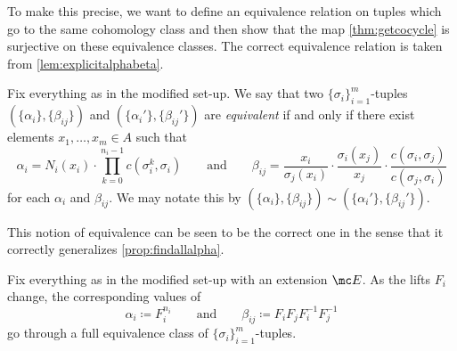 \documentclass{article}
\numberwithin{equation}{section}
\begin{document}
To make this precise, we want to define an equivalence relation on tuples which go to the same cohomology class and then show that the map \autoref{thm:getcocycle} is surjective on these equivalence classes. The correct equivalence relation is taken from \autoref{lem:explicitalphabeta}.
\begin{definition}
	Fix everything as in the modified set-up. We say that two $\{\sigma_i\}_{i=1}^m$-tuples $(\{\alpha_i\},\{\beta_{ij}\})$ and $(\{\alpha_i'\},\{\beta_{ij}'\})$ are \textit{equivalent} if and only if there exist elements $x_1,\ldots,x_m\in A$ such that
	\[\alpha_i=N_i(x_i)\cdot\prod_{k=0}^{n_i-1}c\left(\sigma_i^k,\sigma_i\right)\qquad\text{and}\qquad\beta_{ij}=\frac{x_i}{\sigma_j(x_i)}\cdot\frac{\sigma_i(x_j)}{x_j}\cdot\frac{c(\sigma_i,\sigma_j)}{c(\sigma_j,\sigma_i)}\]
	for each $\alpha_i$ and $\beta_{ij}$. We may notate this by $(\{\alpha_i\},\{\beta_{ij}\})\sim(\{\alpha_i'\},\{\beta_{ij}'\})$.
\end{definition}
This notion of equivalence can be seen to be the correct one in the sense that it correctly generalizes \autoref{prop:findallalpha}.
\begin{proposition} \label{prop:extenmakesaclass}
	Fix everything as in the modified set-up with an extension $\mc E$. As the lifts $F_i$ change, the corresponding values of
	\[\alpha_i\coloneqq F_i^{n_i}\qquad\text{and}\qquad\beta_{ij}\coloneqq F_iF_jF_i^{-1}F_j^{-1}\]
	go through a full equivalence class of $\{\sigma_i\}_{i=1}^m$-tuples.
\end{proposition}
\end{document}
